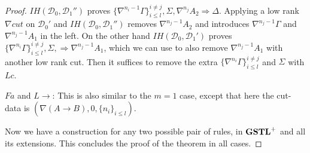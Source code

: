 \begin{proof}
   $IH(\mathcal{D}_0, \mathcal{D}_1'')$ proves $\{\nabla^{n_i-1} \Gamma\}_{i \leq l}^{i \neq j}, \Sigma, \nabla^{n_j} A_2 \Rightarrow \Delta$. Applying a low rank $\nabla cut$ on $\mathcal{D}_0'$ and $IH(\mathcal{D}_0, \mathcal{D}_1'')$ removes $\nabla^{n_j-1} A_2$ and introduces $\nabla^{n_j-1} \Gamma$ and $\nabla^{n_j-1} A_1$ in the left. On the other hand $IH(\mathcal{D}_0, \mathcal{D}_1')$ proves $\{\nabla^{n_i} \Gamma\}_{i \leq l}^{i \neq j}, \Sigma, \Rightarrow \nabla^{n_j-1} A_1$, which we can use to also remove $\nabla^{n_j-1} A_1$ with another low rank cut. Then it suffices to remove the extra $\{\nabla^{n_i} \Gamma\}_{i \leq l}^{i \neq j}$ and $\Sigma$ with $Lc$.
  
   $Fa$ and $L \rightarrow$: This is also similar to the $m = 1$ case, except that here the cut-data is $(\nabla (A \rightarrow B), 0, \{n_i\}_{i \leq l})$.
   \vspace{5mm}
  
   Now we have a construction for any two possible pair of rules, in $\mathbf{GSTL}^+$ and all its extensions. This concludes the proof of the theorem in all cases.
  
  \end{proof}
